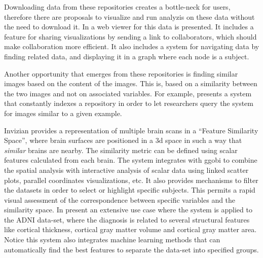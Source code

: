 Downloading data from these repositories creates a bottle-neck for users, therefore there are proposals to visualize and run analyzis on these data without the need to download it. In \autocite{gutman_web_2014} a web viewer for this data is presented. It includes a feature for sharing visualizations by sending a link to collaborators, which should make collaboration more efficient. It also includes a system for navigating data by finding related data, and displaying it in a graph where each node is a subject. 

Another opportunity that emerges from these repositories is finding similar images based on the content of the images. This is, based on a similarity between the two images and not on associated variables. For example, \autocite{joshi_interactive_2009} presents a system that constantly indexes a repository in order to let researchers query the system for images similar to a given example. 

Invizian \autocite{bowman_query-based_2011, bowman_visual_2012, van_horn_graphical_2013} provides a representation of multiple brain scans in a ``Feature Similarity Space'', where brain surfaces are positioned in a 3d space in such a way that \emph{similar} brains are nearby. The similarity metric can be defined using scalar features calculated from each brain. The system integrates with ggobi to combine the spatial analysis with interactive analysis of scalar data using linked scatter plots, parallel coordinates visualizations, etc. It also provides mechanisms to filter the datasets in order to select or highlight specific subjects. This permits a rapid visual assessment of the correspondence between specific variables and the similarity space.  In \autocite{van_horn_graphical_2014} present an extensive use case where the system is applied to the ADNI data-set, where the diagnosis is related to several structural features like cortical thickness, cortical gray matter volume and cortical gray matter area. Notice this system also integrates machine learning methods that can automatically find the best features to separate the data-set into specified groups. 



